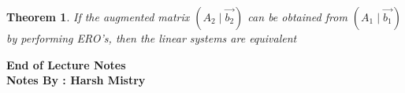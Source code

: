 \documentclass{article}
\newcounter{lecnum}
\newtheorem{theorem}{Theorem}[lecnum]
\begin{document}
\begin{theorem}
If the augmented matrix \( (A_2 \mid \vec{b_2} )\) can be obtained from \( (A_1 \mid \vec{b_1} )\) by performing ERO's, then the linear systems are equivalent
\end{theorem}



\begin{center}
\textbf{End of Lecture Notes} \\
\textbf{Notes By : Harsh Mistry}
\end{center}
\end{document}
